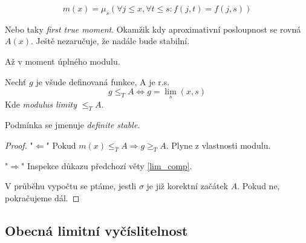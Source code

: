 \begin{definition}
	\[ m(x) = \mu_s(\forall j \leq x, \forall t \leq s: f(j, t) = f(j, s)) \]
\end{definition}

\begin{definition}
	Nebo taky \emph{first true moment}.
	Okamžik kdy aproximativní posloupnost se rovná $A(x)$.
	Ještě nezaručuje, že nadále bude stabilní.

	Až v moment úplného modulu.
\end{definition}

\begin{theorem}
	Nechť $g$ je všude definovaná funkce, A je r.s.
	\[ g \leq_T A \iff g = \lim_s(x, s) \]
	Kde \emph{modulus limity} $\leq_T A$.

	Podmínka se jmenuje \emph{definite stable}.
\end{theorem}
\begin{proof}
	"$\Leftarrow$" Pokud $m(x) \leq_T A \Rightarrow g \geq_T A$.
	Plyne z vlastnosti modulu.

	"$\Rightarrow$" Inspekce důkazu předchozí věty \cref{lim_comp}.

	V průběhu vypočtu se ptáme, jestli $\sigma$ je již korektní začátek $A$. Pokud ne, pokračujeme dál.
\end{proof}

\subsection{Obecná limitní vyčíslitelnost}


